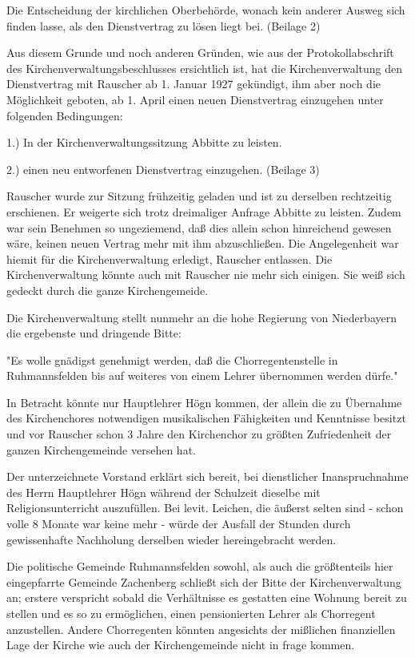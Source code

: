 \documentclass[12pt,a4paper]{book}
\begin{document}
Die Entscheidung der kirchlichen Oberbehörde, wonach kein anderer Ausweg sich
finden lasse, als den Dienstvertrag zu lösen liegt bei. (Beilage 2)

Aus diesem Grunde und noch anderen Gründen, wie aus der Protokollabschrift des
Kirchenverwaltungsbeschlusses ersichtlich ist, hat die Kirchenverwaltung den
Dienstvertrag mit Rauscher ab 1. Januar 1927 gekündigt, ihm aber noch die
Möglichkeit geboten, ab 1. April einen neuen Dienstvertrag einzugehen unter
folgenden Bedingungen:

    1.) In der Kirchenverwaltungssitzung Abbitte zu leisten.

    2.) einen neu entworfenen Dienstvertrag einzugehen. (Beilage 3)

Rauscher wurde zur Sitzung frühzeitig geladen und ist zu derselben rechtzeitig
erschienen. Er weigerte sich trotz dreimaliger Anfrage Abbitte zu leisten. Zudem
war sein Benehmen so ungeziemend, daß dies allein schon hinreichend gewesen
wäre, keinen neuen Vertrag mehr mit ihm abzuschließen. Die Angelegenheit war
hiemit für die Kirchenverwaltung erledigt, Rauscher entlassen. Die
Kirchenverwaltung könnte auch mit Rauscher nie mehr sich einigen. Sie weiß sich
gedeckt durch die ganze Kirchengemeide.

Die Kirchenverwaltung stellt nunmehr an die hohe Regierung von Niederbayern die
ergebenste und dringende Bitte:

"Es wolle gnädigst genehmigt werden, daß die Chorregentenstelle in
Ruhmannsfelden bis auf weiteres von einem Lehrer übernommen werden dürfe."

In Betracht könnte nur Hauptlehrer Högn kommen, der allein die zu Übernahme des
Kirchenchores notwendigen musikalischen Fähigkeiten und Kenntnisse besitzt und
vor Rauscher schon 3 Jahre den Kirchenchor zu größten Zufriedenheit der ganzen
Kirchengemeinde versehen hat.

Der unterzeichnete Vorstand erklärt sich bereit, bei dienstlicher
Inanspruchnahme des Herrn Hauptlehrer Högn während der Schulzeit dieselbe mit
Religionsunterricht auszufüllen. Bei levit. Leichen, die äußerst selten sind -
schon volle 8 Monate war keine mehr - würde der Ausfall der Stunden durch
gewissenhafte Nachholung derselben wieder hereingebracht werden.

Die politische Gemeinde Ruhmannsfelden sowohl, als auch die größtenteils hier
eingepfarrte Gemeinde Zachenberg schließt sich der Bitte der Kirchenverwaltung
an; erstere verspricht sobald die Verhältnisse es gestatten eine Wohnung bereit
zu stellen und es so zu ermöglichen, einen pensionierten Lehrer als Chorregent
anzustellen. Andere Chorregenten könnten angesichts der mißlichen finanziellen
Lage der Kirche wie auch der Kirchengemeinde nicht in frage kommen.
\end{document}
